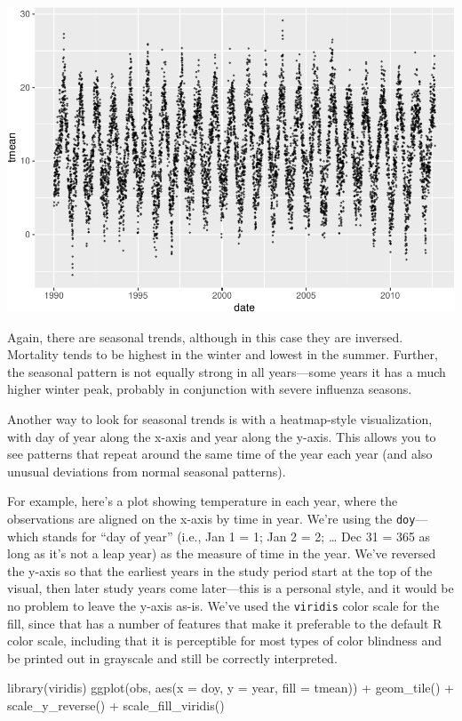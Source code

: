\documentclass[
]{book}
\newenvironment{Shaded}{\begin{snugshade}}{\end{snugshade}}
\newcommand{\AttributeTok}[1]{\textcolor[rgb]{0.77,0.63,0.00}{#1}}
\newcommand{\FunctionTok}[1]{\textcolor[rgb]{0.00,0.00,0.00}{#1}}
\newcommand{\NormalTok}[1]{#1}
\newcommand{\SpecialCharTok}[1]{\textcolor[rgb]{0.00,0.00,0.00}{#1}}
\begin{document}
\includegraphics{adv_epi_analysis_files/figure-latex/unnamed-chunk-10-1.pdf}

Again, there are seasonal trends, although in this case they are inversed.
Mortality tends to be highest in the winter and lowest in the summer. Further, the
seasonal pattern is not equally strong in all years---some years it has a much
higher winter peak, probably in conjunction with severe influenza seasons.

Another way to look for seasonal trends is with a heatmap-style visualization,
with day of year along the x-axis and year along the y-axis. This allows you
to see patterns that repeat around the same time of the year each year (and
also unusual deviations from normal seasonal patterns).

For example, here's a plot showing temperature in each year, where the
observations are aligned on the x-axis by time in year. We're using the \texttt{doy}---which stands for ``day of year'' (i.e., Jan 1 = 1; Jan 2 = 2; \ldots{} Dec 31 = 365 as long
as it's not a leap year) as the measure of time in the year. We've reversed
the y-axis so that the earliest years in the study period start at the top
of the visual, then later study years come later---this is a personal style,
and it would be no problem to leave the y-axis as-is. We've used the
\texttt{viridis} color scale for the fill, since that has a number of features
that make it preferable to the default R color scale, including that it
is perceptible for most types of color blindness and be printed out in grayscale
and still be correctly interpreted.

\begin{Shaded}
\begin{Highlighting}[]
\FunctionTok{library}\NormalTok{(viridis)}
\FunctionTok{ggplot}\NormalTok{(obs, }\FunctionTok{aes}\NormalTok{(}\AttributeTok{x =}\NormalTok{ doy, }\AttributeTok{y =}\NormalTok{ year, }\AttributeTok{fill =}\NormalTok{ tmean)) }\SpecialCharTok{+} 
  \FunctionTok{geom\_tile}\NormalTok{() }\SpecialCharTok{+}
  \FunctionTok{scale\_y\_reverse}\NormalTok{() }\SpecialCharTok{+} 
  \FunctionTok{scale\_fill\_viridis}\NormalTok{()}
\end{Highlighting}
\end{Shaded}
\end{document}
